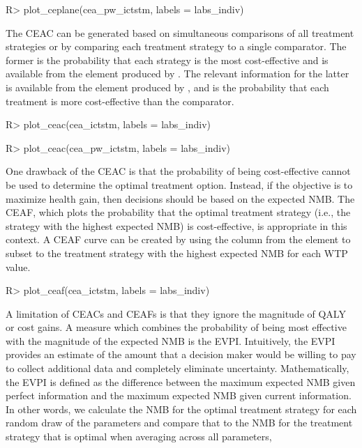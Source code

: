 \documentclass[article, nojss]{jss}\usepackage[]{graphicx}\usepackage[]{color}
\begin{document}
\begin{Schunk}
\begin{Sinput}
R> plot_ceplane(cea_pw_ictstm, labels = labs_indiv)
\end{Sinput}
\end{Schunk}

The CEAC can be generated based on simultaneous comparisons of all treatment strategies or by comparing each treatment strategy to a single comparator. The former is the probability that each strategy is the most cost-effective and is available from the  element produced by . The relevant information for the latter is available from the  element produced by , and is the probability that each treatment is more cost-effective than the comparator.

\begin{Schunk}
\begin{Sinput}
R> plot_ceac(cea_ictstm, labels = labs_indiv)
\end{Sinput}
\begin{Sinput}
R> plot_ceac(cea_pw_ictstm, labels = labs_indiv)
\end{Sinput}
\end{Schunk}

One drawback of the CEAC is that the probability of being cost-effective cannot be used to determine the optimal treatment option. Instead, if the objective is to maximize health gain, then decisions should be based on the expected NMB. The CEAF, which plots the probability that the optimal treatment strategy (i.e., the strategy with the highest expected NMB) is cost-effective, is appropriate in this context. A CEAF curve can be created by using the  column from the  element to subset to the treatment strategy with the highest expected NMB for each WTP value.

\begin{Schunk}
\begin{Sinput}
R> plot_ceaf(cea_ictstm, labels = labs_indiv)
\end{Sinput}
\end{Schunk}

A limitation of CEACs and CEAFs is that they ignore the magnitude of QALY or cost gains. A measure which combines the probability of being most effective with the magnitude of the expected NMB is the EVPI. Intuitively, the EVPI provides an estimate of the amount that a decision maker would be willing to pay to collect additional data and completely eliminate uncertainty. Mathematically, the EVPI is defined as the difference between the maximum expected NMB given perfect information and the maximum expected NMB given current information. In other words, we calculate the NMB for the optimal treatment strategy for each random draw of the parameters and compare that to the NMB for the treatment strategy that is optimal when averaging across all parameters,
\end{document}
